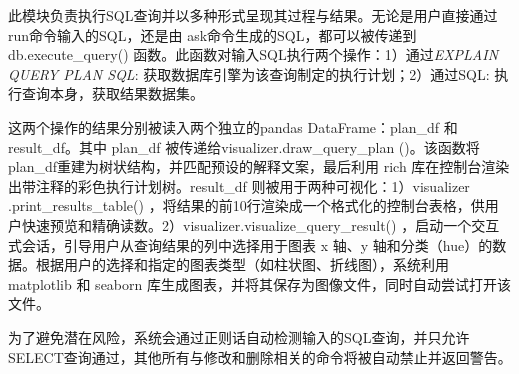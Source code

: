 \begin{CJK*}{UTF8}{song}

此模块负责执行SQL查询并以多种形式呈现其过程与结果。无论是用户直接通过 run命令输入的SQL，还是由 ask命令生成的SQL，都可以被传递到 db.execute\_query() 函数。此函数对输入SQL执行两个操作：1）通过\textit{EXPLAIN QUERY PLAN SQL}: 获取数据库引擎为该查询制定的执行计划；2）通过SQL: 执行查询本身，获取结果数据集。

这两个操作的结果分别被读入两个独立的pandas DataFrame：plan\_df 和 result\_df。其中 plan\_df 被传递给visualizer.draw\_query\_plan ()。该函数将plan\_df重建为树状结构，并匹配预设的解释文案，最后利用 rich 库在控制台渲染出带注释的彩色执行计划树。result\_df 则被用于两种可视化：1）visualizer .print\_results\_table() ，将结果的前10行渲染成一个格式化的控制台表格，供用户快速预览和精确读数。2）visualizer.visualize\_query\_result() ，启动一个交互式会话，引导用户从查询结果的列中选择用于图表 x 轴、y 轴和分类（hue）的数据。根据用户的选择和指定的图表类型（如柱状图、折线图），系统利用 matplotlib 和 seaborn 库生成图表，并将其保存为图像文件，同时自动尝试打开该文件。

为了避免潜在风险，系统会通过正则话自动检测输入的SQL查询，并只允许SELECT查询通过，其他所有与修改和删除相关的命令将被自动禁止并返回警告。

\end{CJK*}